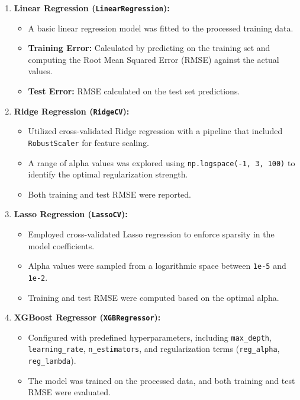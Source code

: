 \documentclass[11pt,a4paper]{article}
\begin{document}
\begin{enumerate}
  \item \textbf{Linear Regression (\texttt{LinearRegression}):}
        \begin{itemize}
          \item A basic linear regression model was fitted to the processed training data.
          \item \textbf{Training Error:} Calculated by predicting on the training set and computing the Root Mean Squared Error (RMSE) against the actual values.
          \item \textbf{Test Error:} RMSE calculated on the test set predictions.
        \end{itemize}

  \item \textbf{Ridge Regression (\texttt{RidgeCV}):}
        \begin{itemize}
          \item Utilized cross-validated Ridge regression with a pipeline that included
                \texttt{RobustScaler} for feature scaling.
          \item A range of alpha values was explored using \texttt{np.logspace(-1, 3, 100)} to
                identify the optimal regularization strength.
          \item Both training and test RMSE were reported.
        \end{itemize}

  \item \textbf{Lasso Regression (\texttt{LassoCV}):}
        \begin{itemize}
          \item Employed cross-validated Lasso regression to enforce sparsity in the model
                coefficients.
          \item Alpha values were sampled from a logarithmic space between \texttt{1e-5} and
                \texttt{1e-2}.
          \item Training and test RMSE were computed based on the optimal alpha.
        \end{itemize}

  \item \textbf{XGBoost Regressor (\texttt{XGBRegressor}):}
        \begin{itemize}
          \item Configured with predefined hyperparameters, including \texttt{max\_depth},
                \texttt{learning\_rate}, \texttt{n\_estimators}, and regularization terms
                (\texttt{reg\_alpha}, \texttt{reg\_lambda}).
          \item The model was trained on the processed data, and both training and test RMSE
                were evaluated.
        \end{itemize}
\end{enumerate}
\end{document}
